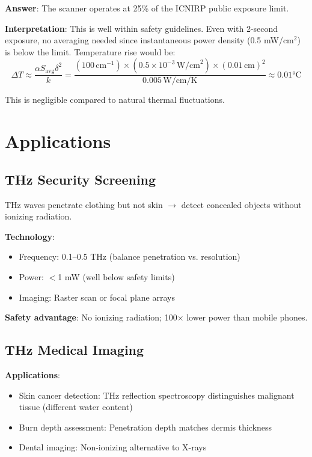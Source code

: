 \textbf{Answer}: The scanner operates at 25\% of the ICNIRP public exposure limit.

\textbf{Interpretation}: This is well within safety guidelines. Even with 2-second exposure, no averaging needed since instantaneous power density (0.5 mW/cm$^2$) is below the limit. Temperature rise would be:
\begin{equation}
\Delta T \approx \frac{\alpha S_{\text{avg}} \delta^2}{k} = \frac{(100\,\text{cm}^{-1}) \times (0.5 \times 10^{-3}\,\text{W/cm}^2) \times (0.01\,\text{cm})^2}{0.005\,\text{W/cm/K}} \approx 0.01°\text{C}
\end{equation}

This is negligible compared to natural thermal fluctuations.

\section{Applications}

\subsection{THz Security Screening}

THz waves penetrate clothing but not skin $\rightarrow$ detect concealed objects without ionizing radiation.

\textbf{Technology}:
\begin{itemize}
\item Frequency: 0.1--0.5 THz (balance penetration vs. resolution)
\item Power: $<$1 mW (well below safety limits)
\item Imaging: Raster scan or focal plane arrays
\end{itemize}

\textbf{Safety advantage}: No ionizing radiation; 100× lower power than mobile phones.

\subsection{THz Medical Imaging}

\textbf{Applications}:
\begin{itemize}
\item Skin cancer detection: THz reflection spectroscopy distinguishes malignant tissue (different water content)
\item Burn depth assessment: Penetration depth matches dermis thickness
\item Dental imaging: Non-ionizing alternative to X-rays
\end{itemize}

